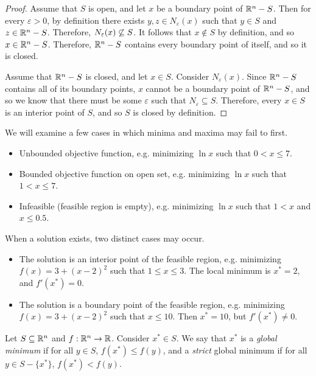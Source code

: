 \begin{proof}
    Assume that $S$ is open, and let $x$ be a boundary point of $\mathbb{R}^n - S$. Then for every $\varepsilon > 0$, by definition there exists $y, z \in N_{\varepsilon}(x)$ such that $y \in S$ and $z \in \mathbb{R}^n - S$. Therefore, $N_{\varepsilon}(x) \centernot\subseteq S$. It follows that $x \notin S$ by definition, and so $x \in \mathbb{R}^n - S$. Therefore, $\mathbb{R}^n - S$ contains every boundary point of itself, and so it is closed.

    Assume that $\mathbb{R}^n - S$ is closed, and let $x \in S$. Consider $N_{\varepsilon}(x)$. Since $\mathbb{R}^n - S$ contains all of its boundary points, $x$ cannot be a boundary point of $\mathbb{R}^n - S$, and so we know that there must be some $\varepsilon$ such that $N_{\varepsilon} \subseteq S$. Therefore, every $x \in S$ is an interior point of $S$, and so $S$ is closed by definition.
\end{proof}

\begin{exmp}
    We will examine a few cases in which minima and maxima may fail to first.

    \begin{itemize}
        \item Unbounded objective function, e.g. minimizing $\ln x$ such that $0 < x \leq 7$.
        \item Bounded objective function on open set, e.g. minimizing $\ln x$ such that $1 < x \leq 7$.
        \item Infeasible (feasible region is empty), e.g. minimizing $\ln x$ such that $1 < x$ and $x \leq 0.5$.
    \end{itemize}
\end{exmp}

\begin{exmp}
    When a solution exists, two distinct cases may occur.

    \begin{itemize}
        \item The solution is an interior point of the feasible region, e.g. minimizing $f(x) = 3 + (x - 2)^2$ such that $1 \leq x \leq 3$. The local minimum is $x^* = 2$, and $f'(x^*) = 0$.
        \item The solution is a boundary point of the feasible region, e.g. minimizing $f(x) = 3 + (x - 2)^2$ such that $x \leq 10$. Then $x^* = 10$, but $f'(x^*) \neq 0$.
    \end{itemize}
\end{exmp}

\begin{defn}
    Let $S \subseteq \mathbb{R}^n$ and $f: \mathbb{R}^n \to \mathbb{R}$. Consider $x^* \in S$. We say that $x^*$ is a \emph{global minimum} if for all $y \in S$, $f(x^*) \leq f(y)$, and a \emph{strict} global minimum if for all $y \in S - \{x^*\}$, $f(x^*) < f(y)$.
\end{defn}

